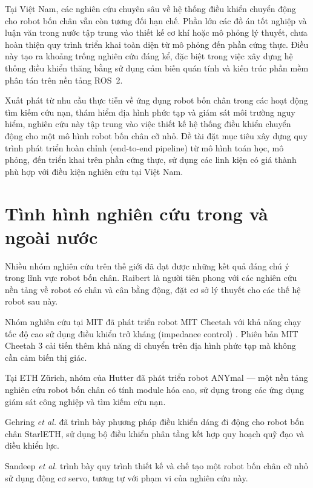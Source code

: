 Tại Việt Nam, các nghiên cứu chuyên sâu về hệ thống điều khiển chuyển động cho robot bốn chân vẫn còn tương đối hạn chế. Phần lớn các đồ án tốt nghiệp và luận văn trong nước tập trung vào thiết kế cơ khí hoặc mô phỏng lý thuyết, chưa hoàn thiện quy trình triển khai toàn diện từ mô phỏng đến phần cứng thực. Điều này tạo ra khoảng trống nghiên cứu đáng kể, đặc biệt trong việc xây dựng hệ thống điều khiển thăng bằng sử dụng cảm biến quán tính và kiến trúc phần mềm phân tán trên nền tảng ROS~2.

Xuất phát từ nhu cầu thực tiễn về ứng dụng robot bốn chân trong các hoạt động tìm kiếm cứu nạn, thám hiểm địa hình phức tạp và giám sát môi trường nguy hiểm, nghiên cứu này tập trung vào việc thiết kế hệ thống điều khiển chuyển động cho một mô hình robot bốn chân cỡ nhỏ. Đề tài đặt mục tiêu xây dựng quy trình phát triển hoàn chỉnh (end-to-end pipeline) từ mô hình toán học, mô phỏng, đến triển khai trên phần cứng thực, sử dụng các linh kiện có giá thành phù hợp với điều kiện nghiên cứu tại Việt Nam.

\section{Tình hình nghiên cứu trong và ngoài nước}

Nhiều nhóm nghiên cứu trên thế giới đã đạt được những kết quả đáng chú ý trong lĩnh vực robot bốn chân. Raibert \cite{raibert1986} là người tiên phong với các nghiên cứu nền tảng về robot có chân và cân bằng động, đặt cơ sở lý thuyết cho các thế hệ robot sau này.

Nhóm nghiên cứu tại MIT đã phát triển robot MIT Cheetah với khả năng chạy tốc độ cao sử dụng điều khiển trở kháng (impedance control) \cite{hyun2014}. Phiên bản MIT Cheetah 3 \cite{bledt2018} cải tiến thêm khả năng di chuyển trên địa hình phức tạp mà không cần cảm biến thị giác.

Tại ETH Zürich, nhóm của Hutter đã phát triển robot ANYmal \cite{hutter2016} --- một nền tảng nghiên cứu robot bốn chân có tính module hóa cao, sử dụng trong các ứng dụng giám sát công nghiệp và tìm kiếm cứu nạn.

Gehring \textit{et al.} \cite{gehring2013} đã trình bày phương pháp điều khiển dáng đi động cho robot bốn chân StarlETH, sử dụng bộ điều khiển phân tầng kết hợp quy hoạch quỹ đạo và điều khiển lực.

Sandeep \textit{et al.} \cite{sandeep2021} trình bày quy trình thiết kế và chế tạo một robot bốn chân cỡ nhỏ sử dụng động cơ servo, tương tự với phạm vi của nghiên cứu này.

